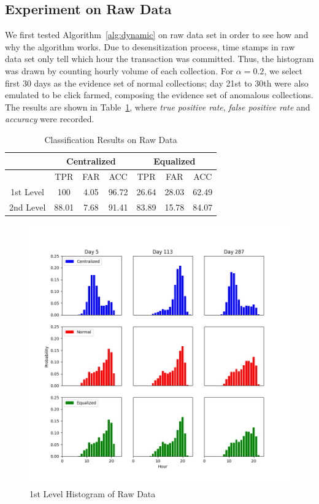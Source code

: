 \documentclass[a4paper]{IEEEtran}
\begin{document}
		\subsection{Experiment on Raw Data}
			We first tested Algorithm~\ref{alg:dynamic} on raw data set in order to see how and why the algorithm works. Due to desensitization process, time stamps in raw data set only tell which hour the transaction was committed. Thus, the histogram was drawn by counting hourly volume of each collection. For $\alpha = 0.2$, we select first 30 days as the evidence set of normal collections; day 21st to 30th were also emulated to be click farmed, composing the evidence set of anomalous collections. The results are shown in Table~\ref{tab:result-raw-1st}, where \textit{true positive rate}, \textit{false positive rate} and \textit{accuracy} were recorded.
			
			\begin{table}[!ht]
				\centering
				\caption{Classification Results on Raw Data}
				\label{tab:result-raw-1st}
				\begin{tabular}{|c|c|c|c|c|c|c|}
					\hline
					& \multicolumn{3}{c|}{Centralized} & \multicolumn{3}{c|}{Equalized}\\
					\hline
					& TPR & FAR & ACC & TPR & FAR & ACC\\
					\hline
					1st Level & 100 & 4.05 & 96.72 & 26.64 & 28.03 & 62.49\\
					\hline
					2nd Level & 88.01 & 7.68 & 91.41 & 83.89 & 15.78 & 84.07\\
					\hline
				\end{tabular}
			\end{table}
			
			\begin{figure}[!ht]
				\centering
				\includegraphics[width=\linewidth]{fig/Raw1stLevelHist.png}
				\caption{1st Level Histogram of Raw Data}
				\label{fig:raw-hist-1st}
			\end{figure}
			
\end{document}
